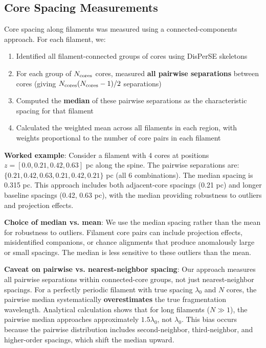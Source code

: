 \documentclass[11pt,a4paper]{article}
\begin{document}
\subsection{Core Spacing Measurements}

Core spacing along filaments was measured using a connected-components approach. For each filament, we:
\begin{enumerate}
    \item Identified all filament-connected groups of cores using DisPerSE skeletons
    \item For each group of $N_{\rm cores}$ cores, measured \textbf{all pairwise separations} between cores (giving $N_{\rm cores}(N_{\rm cores}-1)/2$ separations)
    \item Computed the \textbf{median} of these pairwise separations as the characteristic spacing for that filament
    \item Calculated the weighted mean across all filaments in each region, with weights proportional to the number of core pairs in each filament
\end{enumerate}

\textbf{Worked example}: Consider a filament with 4 cores at positions $z = [0.0, 0.21, 0.42, 0.63]$ pc along the spine. The pairwise separations are: $\{0.21, 0.42, 0.63, 0.21, 0.42, 0.21\}$ pc (all 6 combinations). The median spacing is 0.315 pc. This approach includes both adjacent-core spacings (0.21 pc) and longer baseline spacings (0.42, 0.63 pc), with the median providing robustness to outliers and projection effects.

\textbf{Choice of median vs. mean}: We use the median spacing rather than the mean for robustness to outliers. Filament core pairs can include projection effects, misidentified companions, or chance alignments that produce anomalously large or small spacings. The median is less sensitive to these outliers than the mean.

\textbf{Caveat on pairwise vs. nearest-neighbor spacing}: Our approach measures all pairwise separations within connected-core groups, not just nearest-neighbor spacings. For a perfectly periodic filament with true spacing $\lambda_0$ and $N$ cores, the pairwise median systematically \textbf{overestimates} the true fragmentation wavelength. Analytical calculation shows that for long filaments ($N \gg 1$), the pairwise median approaches approximately $1.5\lambda_0$, not $\lambda_0$. This bias occurs because the pairwise distribution includes second-neighbor, third-neighbor, and higher-order spacings, which shift the median upward.
\end{document}
